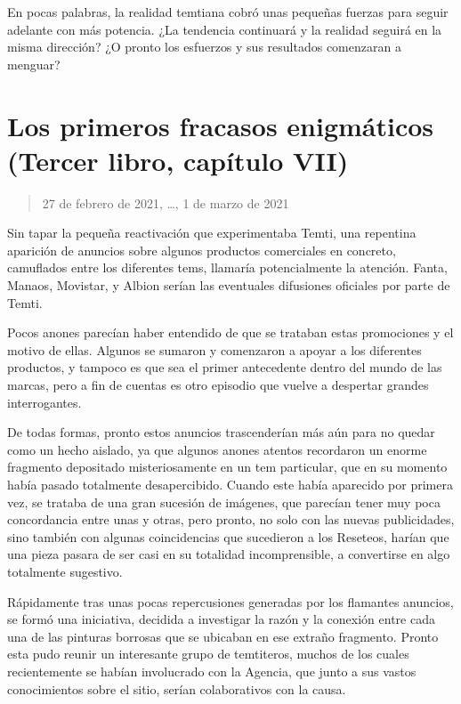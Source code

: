 \documentclass[
  spanish,
]{book}
\begin{document}
En pocas palabras, la realidad temtiana cobró unas pequeñas fuerzas para seguir adelante con más potencia. ¿La tendencia continuará y la realidad seguirá en la misma dirección? ¿O pronto los esfuerzos y sus resultados comenzaran a menguar?

\hypertarget{los-primeros-fracasos-enigmuxe1ticos-tercer-libro-capuxedtulo-vii}{%
\section{Los primeros fracasos enigmáticos (Tercer libro, capítulo VII)}\label{los-primeros-fracasos-enigmuxe1ticos-tercer-libro-capuxedtulo-vii}}

\begin{quote}
27 de febrero de 2021, \ldots, 1 de marzo de 2021
\end{quote}

Sin tapar la pequeña reactivación que experimentaba Temti, una repentina aparición de anuncios sobre algunos productos comerciales en concreto, camuflados entre los diferentes tems, llamaría potencialmente la atención. Fanta, Manaos, Movistar, y Albion serían las eventuales difusiones oficiales por parte de Temti.

Pocos anones parecían haber entendido de que se trataban estas promociones y el motivo de ellas. Algunos se sumaron y comenzaron a apoyar a los diferentes productos, y tampoco es que sea el primer antecedente dentro del mundo de las marcas, pero a fin de cuentas es otro episodio que vuelve a despertar grandes interrogantes.

De todas formas, pronto estos anuncios trascenderían más aún para no quedar como un hecho aislado, ya que algunos anones atentos recordaron un enorme fragmento depositado misteriosamente en un tem particular, que en su momento había pasado totalmente desapercibido. Cuando este había aparecido por primera vez, se trataba de una gran sucesión de imágenes, que parecían tener muy poca concordancia entre unas y otras, pero pronto, no solo con las nuevas publicidades, sino también con algunas coincidencias que sucedieron a los Reseteos, harían que una pieza pasara de ser casi en su totalidad incomprensible, a convertirse en algo totalmente sugestivo.

Rápidamente tras unas pocas repercusiones generadas por los flamantes anuncios, se formó una iniciativa, decidida a investigar la razón y la conexión entre cada una de las pinturas borrosas que se ubicaban en ese extraño fragmento. Pronto esta pudo reunir un interesante grupo de temtiteros, muchos de los cuales recientemente se habían involucrado con la Agencia, que junto a sus vastos conocimientos sobre el sitio, serían colaborativos con la causa.
\end{document}
